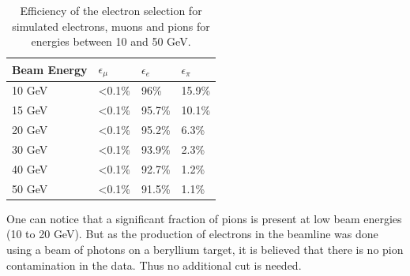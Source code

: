 \begin{table}[htb!]
	\centering
	\caption{Efficiency of the electron selection for simulated electrons, muons and pions for energies between 10 and 50 GeV.}
	\label{table:eff_electron}
	\begin{tabular}{@{} llll @{}}
		\toprule
		\textbf{Beam Energy} & \textbf{$\epsilon_{\mu}$} & \textbf{$\epsilon_{e}$} & \textbf{$\epsilon_{\pi}$}\\
		\midrule
		10 GeV & <0.1\% & 96\% & 15.9\%\\
		15 GeV & <0.1\% & 95.7\% & 10.1\%\\
		20 GeV & <0.1\% & 95.2\% & 6.3\%\\
		30 GeV & <0.1\% & 93.9\% & 2.3\%\\
		40 GeV & <0.1\% & 92.7\% & 1.2\%\\
		50 GeV & <0.1\% & 91.5\% & 1.1\%\\
		\bottomrule
	\end{tabular}
\end{table}

One can notice that a significant fraction of pions is present at low beam energies (10 to 20 GeV). But as the production of electrons in the beamline was done using a beam of photons on a beryllium target, it is believed that there is no pion contamination in the data. Thus no additional cut is needed.

